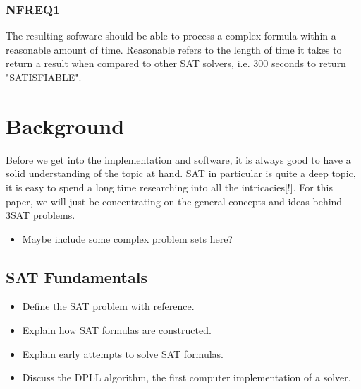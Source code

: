 \documentclass{article}
\begin{document}
\subsubsection{NFREQ1}
The resulting software should be able to process a complex formula within a reasonable amount of time. Reasonable refers to the length of time it takes to return a result when compared to other SAT solvers, i.e. 300 seconds to return "SATISFIABLE".


\section{Background}
Before we get into the implementation and software, it is always good to have a solid understanding
of the topic at hand. SAT in particular is quite a deep topic, it is easy to spend a long time
researching into all the intricacies[!]. For this paper, we will just be concentrating on the
general concepts and ideas behind 3SAT problems.

\begin{itemize}
    \item Maybe include some complex problem sets here?
\end{itemize}


\subsection{SAT Fundamentals}
\begin{itemize}
    \item Define the SAT problem with reference.
    \item Explain how SAT formulas are constructed.
    \item Explain early attempts to solve SAT formulas.
    \item Discuss the DPLL algorithm, the first computer implementation of a solver.
\end{itemize}
\end{document}
